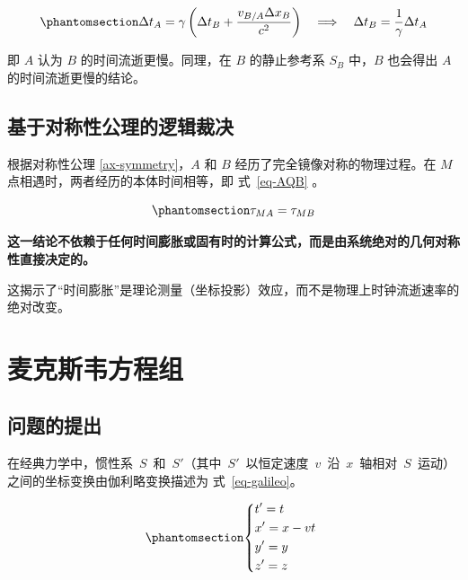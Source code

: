 \documentclass[
  chinese,
  a4paper,
  UTF8,
  12pt,
  oneside,
  openany]{ctexbook}
\begin{document}
\begin{equation}\protect\phantomsection\label{eq-time-dilation-A}{
\Delta t_A = \gamma \left( \Delta t_B + \frac{v_{B/A} \Delta x_B}{c^2} \right)
\quad \Longrightarrow \quad
\Delta t_B = \frac{1}{\gamma} \Delta t_A
}\end{equation}

即 \(A\) 认为 \(B\) 的时间流逝更慢。同理，在 \(B\) 的静止参考系 \(S_B\)
中，\(B\) 也会得出 \(A\) 的时间流逝更慢的结论。

\section{基于对称性公理的逻辑裁决}\label{ux57faux4e8eux5bf9ux79f0ux6027ux516cux7406ux7684ux903bux8f91ux88c1ux51b3}

根据对称性公理 \ref{ax-symmetry}，\(A\) 和 \(B\)
经历了完全镜像对称的物理过程。在 \(M\)
点相遇时，两者经历的本体时间相等，即 式~\ref{eq-AQB} 。

\begin{equation}\protect\phantomsection\label{eq-AQB}{
\tau_{MA} = \tau_{MB}
}\end{equation}

\textbf{这一结论不依赖于任何时间膨胀或固有时的计算公式，而是由系统绝对的几何对称性直接决定的。}

这揭示了``时间膨胀''是理论测量（坐标投影）效应，而不是物理上时钟流逝速率的绝对改变。

\chapter{麦克斯韦方程组}\label{ux9ea6ux514bux65afux97e6ux65b9ux7a0bux7ec4}

\section{问题的提出}\label{ux95eeux9898ux7684ux63d0ux51fa}

在经典力学中，惯性系~\(S\)~和~\(S'\)（其中~\(S'\)~以恒定速度~\(v\)~沿~\(x\)~轴相对~\(S\)~运动）之间的坐标变换由伽利略变换描述为
式~\ref{eq-galileo}。

\begin{equation}\protect\phantomsection\label{eq-galileo}{
\left\{ \begin{aligned}
   & t' = t \\
   & x' = x - vt \\
   & y' = y \\
   & z' = z
  \end{aligned} \right.\
}\end{equation}
\end{document}
